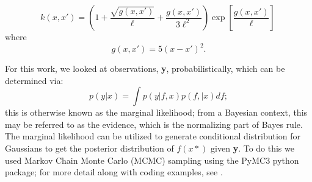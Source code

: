 \documentclass[peerreview]{ieeesyscoin}
\begin{document}
\begin{equation}
k(x,x') = \left( 1 + \dfrac{\sqrt{g(x,x')}}{\ell} + \dfrac{g(x,x')}{3\ell^2}\right)\exp\left[ \dfrac{g(x,x')}{\ell} \right]\ 
\end{equation}
where
\begin{equation}
	g(x,x') = 5(x-x')^2.
\end{equation}

For this work, we looked at observations, \textbf{y}, probabilistically, which can be determined via:
\begin{equation}
p(y|x) = \int p(y | f,x) p (f, |x) df;
\end{equation}
this is otherwise known as the marginal likelihood; from a Bayesian context, this may be referred to as the evidence, which is the normalizing part of Bayes rule. The marginal likelihood can be utilized to generate conditional distribution for Gaussians to get the posterior distribution of $f(x*)$ given \textbf{y}. To do this we used Markov Chain Monte Carlo (MCMC) sampling using the PyMC3 python package; for more detail along with coding examples, see \cite{Fon20}.
\end{document}
